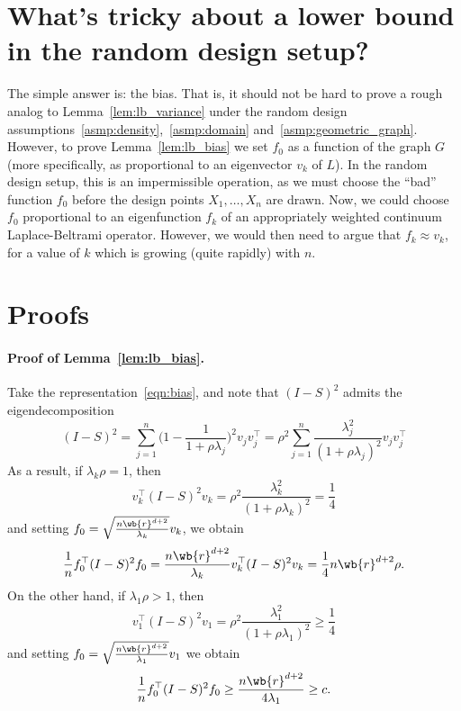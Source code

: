 \documentclass{article}
\newcommand{\1}{\mathbf{1}}
\theoremstyle{definition}
\theoremstyle{remark}
\begin{document}
\section{What's tricky about a lower bound in the random design setup?}
The simple answer is: the bias. That is, it should not be hard to prove a rough analog to Lemma~\ref{lem:lb_variance} under the random design assumptions~\ref{asmp:density},~\ref{asmp:domain} and~\ref{asmp:geometric_graph}. However, to prove Lemma~\ref{lem:lb_bias} we set $f_0$ as a function of the graph $G$ (more specifically, as proportional to an eigenvector $v_k$ of $L$). In the random design setup, this is an impermissible operation, as we must choose the ``bad'' function $f_0$ before the design points $X_1,\ldots,X_n$ are drawn. Now, we could choose $f_0$ proportional to an eigenfunction $f_k$ of an appropriately weighted continuum Laplace-Beltrami operator. However, we would then need to argue that $f_k \approx v_k$, for a value of $k$ which is growing (quite rapidly) with $n$. 

\section{Proofs}

\paragraph{Proof of Lemma~\ref{lem:lb_bias}.}
Take the representation~\eqref{eqn:bias}, and note that $(I - S)^2$ admits the eigendecomposition
\begin{equation*}
(I - S)^2 = \sum_{j = 1}^{n} \biggl(1 - \frac{1}{1 + \rho\lambda_j}\biggr)^2 v_j v_j^{\top} = \rho^2 \sum_{j = 1}^{n}\frac{\lambda_j^2}{(1 + \rho \lambda_j)^2} v_j v_j^{\top}
\end{equation*}
As a result, if $\lambda_k\rho = 1$, then 
\begin{equation*}
v_k^{\top} (I - S)^2 v_k = \rho^2 \frac{\lambda_k^2}{(1 + \rho \lambda_k)^2} = \frac{1}{4}
\end{equation*}
and setting $f_0 = \sqrt{\frac{n\wb{r}^{d+2}}{\lambda_k}}v_k$, we obtain
\begin{equation*}
\frac{1}{n}f_0^{\top} (I - S)^2 f_0 = \frac{n\wb{r}^{d + 2}}{\lambda_k} v_k^{\top} (I - S)^2 v_k =  \frac{1}{4}n\wb{r}^{d + 2}\rho.
\end{equation*}
On the other hand, if $\lambda_1\rho > 1$, then
\begin{equation*}
v_1^{\top} (I - S)^2 v_1  = \rho^2 \frac{\lambda_1^2}{(1 + \rho \lambda_1)^2} \geq \frac{1}{4}
\end{equation*}
and setting $f_0 = \sqrt{\frac{n\wb{r}^{d+2}}{\lambda_1}}v_1$ we obtain
\begin{equation*}
\frac{1}{n} f_0^{\top} (I - S)^2 f_0 \geq \frac{n\wb{r}^{d + 2}}{4\lambda_1} \geq c.
\end{equation*}
\end{document}
